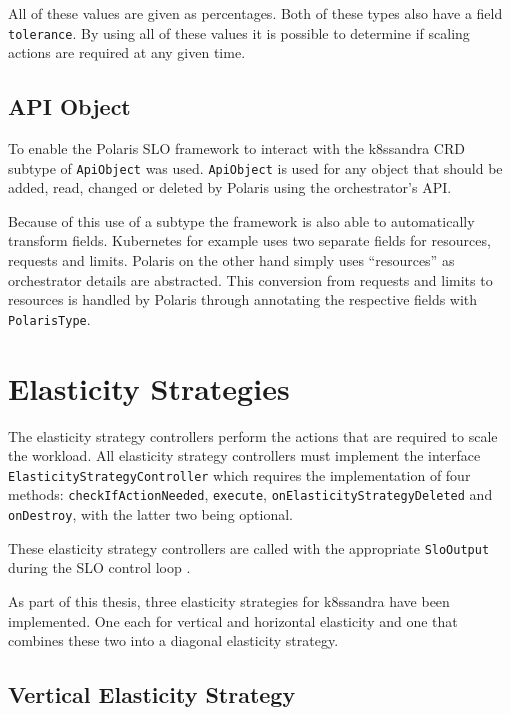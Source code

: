 All of these values are given as percentages. Both of these types also have a field \texttt{tolerance}. By using all of these values it is possible to determine if scaling actions are required at any given time. 

\subsection{API Object}

To enable the Polaris SLO framework to interact with the k8ssandra CRD subtype of \texttt{ApiObject} was used. \texttt{ApiObject} is used for any object that should be added, read, changed or deleted by Polaris using the orchestrator's API.

Because of this use of a subtype the framework is also able to automatically transform fields. Kubernetes for example uses two separate fields for resources, requests and limits. Polaris on the other hand simply uses ``resources'' as orchestrator details are abstracted. This conversion from requests and limits to resources is handled by Polaris through annotating the respective fields with \texttt{PolarisType}.

\section{Elasticity Strategies}

The elasticity strategy controllers perform the actions that are required to scale the workload. All elasticity strategy controllers must implement the interface \texttt{Elasticity\-Strategy\-Controller} which requires the implementation of four methods: \texttt{check\-If\-Action\-Needed}, \texttt{execute}, \texttt{on\-Elasticity\-Strategy\-Deleted} and \texttt{on\-Destroy}, with the latter two being optional.

These elasticity strategy controllers are called with the appropriate \texttt{SloOutput} during the SLO control loop \cite{pusztaiNovelMiddlewareEfficiently2021a}.

As part of this thesis, three elasticity strategies for k8ssandra have been implemented. One each for vertical and horizontal elasticity and one that combines these two into a diagonal elasticity strategy.

\subsection{Vertical Elasticity Strategy}
\label{sec:vertical-elasticity}

